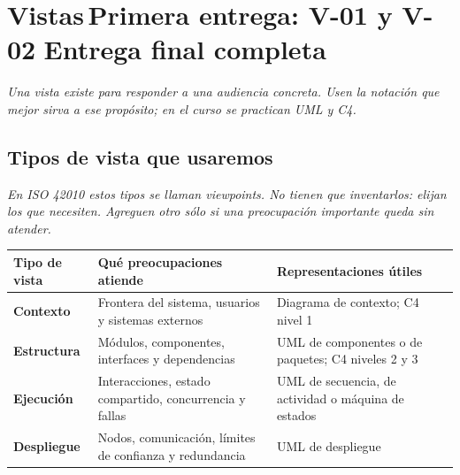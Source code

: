 \documentclass[11pt,letterpaper]{article}
\newcommand{\hint}[1]{{\itshape\color{black!70}#1}\par} %
\newcommand{\bluebadge}[1]{\hspace{0.8em}\colorbox{SADBlueBg}{\scriptsize\bfseries\color{SADBlue}\,#1\,}}
\newcommand{\greenbadge}[1]{\hspace{0.4em}\colorbox{SADGreenBg}{\scriptsize\bfseries\color{SADGreen}\,#1\,}}
\newcommand{\hd}[1]{\textbf{\small #1}}
\newcommand{\headrow}{\rowcolor{SADHead}}
\begin{document}
\section{Vistas\bluebadge{Primera entrega: V-01 y V-02}\greenbadge{Entrega final completa}}
\hint{Una vista existe para responder a una audiencia concreta. Usen la notación que mejor sirva a ese propósito; en el curso se practican UML y C4.}

\subsection{Tipos de vista que usaremos}
\hint{En ISO 42010 estos tipos se llaman viewpoints. No tienen que inventarlos: elijan los que necesiten. Agreguen otro sólo si una preocupación importante queda sin atender.}
\noindent\begin{tabularx}{\linewidth}{|p{2.6cm}|Y|Y|}\hline
  \headrow\hd{Tipo de vista} & \hd{Qué preocupaciones atiende} & \hd{Representaciones útiles}\\\hline
  \small\bfseries Contexto & \small Frontera del sistema, usuarios y sistemas externos & \small Diagrama de contexto; C4 nivel 1\\\hline
  \small\bfseries Estructura & \small Módulos, componentes, interfaces y dependencias & \small UML de componentes o de paquetes; C4 niveles 2 y 3\\\hline
  \small\bfseries Ejecución & \small Interacciones, estado compartido, concurrencia y fallas & \small UML de secuencia, de actividad o máquina de estados\\\hline
  \small\bfseries Despliegue & \small Nodos, comunicación, límites de confianza y redundancia & \small UML de despliegue\\\hline
\end{tabularx}
\end{document}
